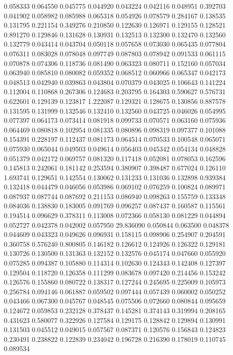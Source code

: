 0.058333
0.064550
0.045775
0.044920
0.043224
0.042116
0.048951
0.392703
0.041902
0.058982
0.085988
0.065318
0.054926
0.078579
0.284167
0.138535
0.131795
0.221154
0.349276
0.210850
0.122630
0.126971
0.129155
0.128521
0.891270
0.129846
0.131628
0.130931
0.132513
0.132300
0.132470
0.132560
0.132779
0.043414
0.043704
0.050118
0.057658
0.073030
0.065435
0.077804
0.076311
0.083028
0.078048
0.097749
0.087803
0.078942
0.091533
0.061115
0.070878
0.074306
0.118736
0.081490
0.063323
0.080711
0.152160
0.057034
0.063940
0.085810
0.080082
0.059352
0.068512
0.060966
0.065347
0.042173
0.048513
0.042940
0.039863
0.043804
0.070379
0.043025
0.106643
0.141224
0.112004
0.110868
0.267306
0.124683
0.203795
0.164303
0.590627
0.576731
0.622601
0.129139
0.123817
1.222087
0.129321
0.128675
0.130856
0.887578
0.131595
0.131999
0.132546
0.132410
0.132560
0.043725
0.046026
0.054995
0.077397
0.064173
0.073414
0.081918
0.099733
0.070571
0.063160
0.075936
0.064469
0.080818
0.102954
0.081335
0.080896
0.098319
0.097377
0.101088
0.154391
0.228197
0.112437
0.081173
0.064514
0.070533
0.100548
0.065071
0.075930
0.065044
0.049503
0.049614
0.056403
0.045342
0.054134
0.048828
0.051379
0.042172
0.069757
0.081320
0.117418
0.052081
0.078053
0.162596
0.145813
0.242061
0.181142
0.253594
0.380907
0.398487
0.677024
0.126110
1.693741
0.129651
0.142554
0.130062
0.131233
0.131036
0.132898
0.939384
0.132418
0.044479
0.046056
0.053986
0.069102
0.076259
0.100824
0.089971
0.087937
0.087744
0.087692
0.211153
0.086940
0.098263
0.155759
0.133348
0.084036
0.138830
0.183005
0.091769
0.096257
0.087437
0.160587
0.115561
0.194514
0.096629
0.378311
0.113008
0.072366
0.058130
0.081229
0.044894
0.052727
0.042378
0.042002
0.057950
29.836090
0.050844
0.063500
0.048378
0.044609
0.043323
0.049626
0.096931
0.158115
0.098906
0.254907
0.204591
0.360758
0.576240
0.800805
0.146182
0.126612
0.124926
0.126322
0.129181
0.130726
0.130500
0.131363
0.132152
0.132576
0.045174
0.047660
0.055920
0.075285
0.094387
0.105880
0.114314
0.102630
0.124343
0.142408
0.127397
0.129504
0.118720
0.126358
0.111299
0.083678
0.097420
0.214456
0.153242
0.126576
0.155860
0.080722
0.138317
0.127244
0.245695
0.225009
0.105973
0.256784
0.094146
0.061887
0.059502
0.097444
0.057439
0.060002
0.050252
0.043466
0.067300
0.045767
0.048545
0.075506
0.072660
0.080844
0.095659
0.124672
0.059853
0.232128
0.378437
0.145281
0.374143
0.319994
0.208165
0.431623
0.580077
0.322926
0.127584
0.129175
0.128842
0.129894
0.130991
0.131503
0.045512
0.049015
0.057567
0.087371
0.120576
0.156843
0.124823
0.230491
0.238822
0.122839
0.234042
0.196728
0.216390
0.178019
0.110745
0.089534
